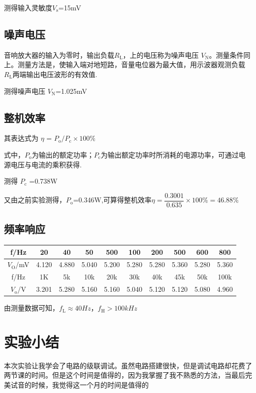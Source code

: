 \documentclass[a4paper,11pt,UTF8]{article}
\numberwithin{equation}{subsection}
\begin{document}
测得输入灵敏度$V_\mathrm{s}$=15mV
\subsection{噪声电压}
音响放大器的输入为零时，输出负载$R_\mathrm{L}$，上的电压称为噪声电压 $V_\mathrm{N}$。测量条件同上。测量方法是，使输入端对地短路，音量电位器为最大值，用示波器观测负载 $R_\mathrm{L}$两端输出电压波形的有效值.

测得噪声电压 $V_\mathrm{N}$={1.025mV}

\subsection{整机效率}
其表达式为 $\eta$ = $P_\mathrm{o}/P_\mathrm{c}\times100\%$

式中，$P_\mathrm{o}$为输出的额定功率；$P_\mathrm{c}$为输出额定功率时所消耗的电源功率，可通过电源电压与电流的乘积获得.

测得 $P_\mathrm{c}$ ={0.738W}

又由之前实验测得，$P_\mathrm{o}$={0.346W},可算得整机效率$\eta=\dfrac{0.3001}{0.635}\times100\%=46.88\%$
\subsection{频率响应}
\begin{table}[H]
	\centering
	\begin{tabular}{|c|c|c|c|c|c|c|c|c|c|}
		\hline
		f/Hz& 20 & 40&50&500&100&200&500&600&800\\
		\hline
		$V_\mathrm{O}$/mV& 4.120 & 4.880&5.040&5.200&5.280&5.280&5.360&5.280&5.360\\
		\hline
		f/Hz& 1K& 5k&10k&20k&30k&40k&45k&50k&100k\\
		\hline
		$V_\mathrm{o}$/V& 3.201 & 5.280&5.160&5.160&5.040&5.120&5.120&5.080&4.960\\
		\hline

		\hline		
	\end{tabular}
\end{table}
由测量数据可知，$f_\mathrm{L}\approx{40Hz}$，$f_\mathrm{H}>{100kHz}$
\section{实验小结}
本次实验让我学会了电路的级联调试。虽然电路搭建很快，但是调试电路却花费了两节课的时间。但是这个时间是值得的，因为我掌握了我不熟悉的方法，当最后完美试音的时候，我觉得这一个月的时间是值得的
\end{document}
